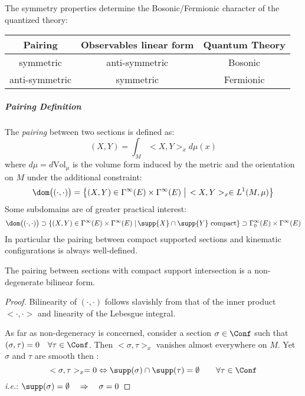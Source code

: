 \documentclass[Main]{subfiles}
\begin{document}
				The
				symmetry properties determine the Bosonic/Fermionic character of the quantized theory:\\
				\begin{tabular}{|c | c | c|}
					\hline
					Pairing & Observables linear form & Quantum Theory\\
					\hline
					symmetric  & anti-symmetric &  Bosonic \\
					anti-symmetric & symmetric & Fermionic \\
					\hline
				\end{tabular}		

			
			\subparagraph{Pairing Definition}
			
				The \emph{pairing} between two sections is defined as:
   					\begin{displaymath}
   								(X,Y) = \int_M <X,Y>_x d\mu(x)
   					\end{displaymath}
   				where $d\mu = d\textrm{Vol}_\mu$ is the volume form induced by the metric and the orientation on $M$
 				 under the additional constraint:
   				\begin{displaymath}
   					\dom\big( (\cdot, \cdot) \big) = 
   					\big\{(X,Y) \in \Gamma^\infty(E) \times \Gamma^\infty(E) \; \big\vert \,  <X,Y>_x \in L^1(M,\mu)\big \}
   				\end{displaymath}
   				Some subdomains are of greater practical interest:
   				\begin{displaymath}
   					\dom\big( (\cdot, \cdot) \big) \supset \{ (X,Y) \in \Gamma^\infty(E) \times \Gamma^\infty(E) \; \vert \, \supp{X} \cap \supp{Y} \textrm{ compact} \} \supset \Gamma^\infty_0 (E) \times \Gamma^\infty(E)
   				\end{displaymath}
   				In particular the pairing between compact supported sections and kinematic configurations is always well-defined.
   				\begin{proposition}
   					The pairing between sections with compact support intersection is a non-degenerate bilinear form.
   				\end{proposition}
   				\begin{proof}
					Bilinearity of $(\cdot,\cdot)$ follows slavishly from that
					of the inner product $<\cdot,\cdot>$ and linearity of the Lebesgue integral.
					
					As far as non-degeneracy is concerned, consider a section $\sigma \in \Conf$ such that $(\sigma, \tau) = 0 \quad \forall \tau \in \Conf$.
   					Then $<\sigma, \tau>_x$ vanishes almost everywhere on $M$.
   					Yet $\sigma$ and $\tau$ are smooth then :
   					\begin{displaymath}
   						<\sigma, \tau >_x = 0 \Leftrightarrow \supp(\sigma) \cap \supp(\tau) = \emptyset \qquad \forall \tau \in \Conf
   					\end{displaymath}
   					\textit{i.e.}: $\supp(\sigma) = \emptyset \quad \Rightarrow \quad \sigma=0$
   				\end{proof}
   				
\end{document}
